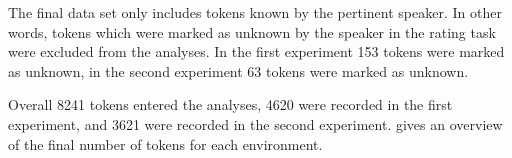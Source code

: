  The final data set only includes tokens known by the pertinent speaker. In other words, tokens which were marked as unknown by the speaker in the rating task were excluded from the analyses. In the first experiment 153 tokens were marked as unknown, in the second experiment 63 tokens were marked as unknown.
 
 Overall 8241 tokens entered the analyses, 4620 were recorded in the first experiment, and  3621 were recorded in the second experiment.  gives an overview of the final number of tokens for each environment. 
  

\begin{table}
	\caption{Distribution of tokens in experimental study}
	\label{tbl:distribution of tokens in experiment}
\end{table}
